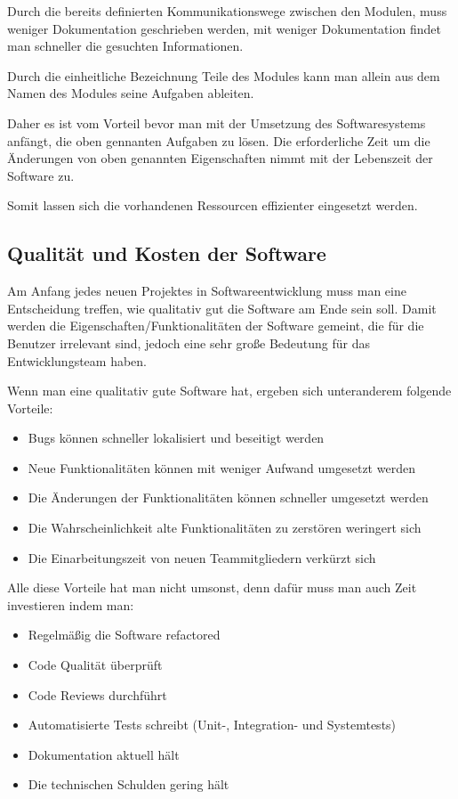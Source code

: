 \documentclass{article}
\begin{document}
    Durch die bereits definierten Kommunikationswege zwischen den Modulen, muss weniger Dokumentation geschrieben werden,
    mit weniger Dokumentation findet man schneller die gesuchten Informationen.

    Durch die einheitliche Bezeichnung Teile des Modules kann man allein aus dem Namen des Modules seine Aufgaben ableiten.

    Daher es ist vom Vorteil bevor man mit der Umsetzung des Softwaresystems anfängt, die oben gennanten Aufgaben zu lösen.
    Die erforderliche Zeit um die Änderungen von oben genannten Eigenschaften nimmt mit der Lebenszeit der Software zu. 

    Somit lassen sich die vorhandenen Ressourcen effizienter eingesetzt werden.


    \newpage
    \subsection{Qualität und Kosten der Software}
    \nocite{MF_isHighQuilatySoftwareWorthTheCost}

    Am Anfang jedes neuen Projektes in Softwareentwicklung muss man eine Entscheidung treffen, wie qualitativ gut die Software am Ende sein soll.
    Damit werden die Eigenschaften/Funktionalitäten der Software gemeint, die für die Benutzer irrelevant sind, jedoch eine sehr große Bedeutung 
    für das Entwicklungsteam haben.
    
    Wenn man eine qualitativ gute Software hat, ergeben sich unteranderem folgende Vorteile:
    \begin{itemize}
        \item Bugs können schneller lokalisiert und beseitigt werden
        \item Neue Funktionalitäten können mit weniger Aufwand umgesetzt werden
        \item Die Änderungen der Funktionalitäten können schneller umgesetzt werden
        \item Die Wahrscheinlichkeit alte Funktionalitäten zu zerstören weringert sich
        \item Die Einarbeitungszeit von neuen Teammitgliedern verkürzt sich 
    \end{itemize}

    Alle diese Vorteile hat man nicht umsonst, denn dafür muss man auch Zeit investieren indem man:
    \begin{itemize}
        \item Regelmäßig die Software refactored
        \item Code Qualität überprüft
        \item Code Reviews durchführt
        \item Automatisierte Tests schreibt (Unit-, Integration- und Systemtests)
        \item Dokumentation aktuell hält
        \item Die technischen Schulden gering hält
    \end{itemize}
\end{document}

